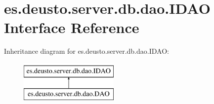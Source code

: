 \hypertarget{interfacees_1_1deusto_1_1server_1_1db_1_1dao_1_1_i_d_a_o}{}\section{es.\+deusto.\+server.\+db.\+dao.\+I\+D\+AO Interface Reference}
\label{interfacees_1_1deusto_1_1server_1_1db_1_1dao_1_1_i_d_a_o}
Inheritance diagram for es.\+deusto.\+server.\+db.\+dao.\+I\+D\+AO\+:\begin{figure}[H]
\begin{center}
\leavevmode
\includegraphics[height=2.000000cm]{interfacees_1_1deusto_1_1server_1_1db_1_1dao_1_1_i_d_a_o}
\end{center}
\end{figure}
